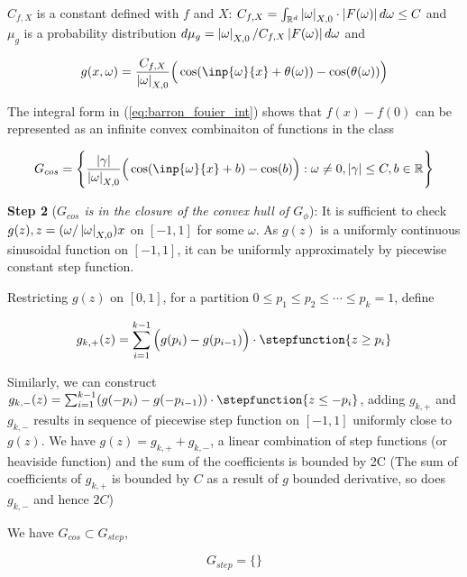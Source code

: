 $C_{f,X}$ is a constant defined with $f$ and 
$X$: $C_{f,X} = \int_{\mathbb{R}^d} \left| \omega \right|_{X, 0} \cdot \left| F(\omega) \right| d\omega \leq C$
and $\mu_g$ is a probability distribution
$d\mu_g = \left| \omega \right|_{X,0}/C_{f,X}\left| F(\omega) \right| d\omega$ and 

\begin{equation}
    g(x, \omega) = \frac{C_{f,X}}{\abs{\omega}_{X, 0}}\Big(\cos(\inp{\omega}{x} + \theta(\omega)) - \cos(\theta(\omega))\Big)
\end{equation}

The integral form in (\ref{eq:barron_fouier_int}) shows that $f(x) - f(0)$
can be represented as an infinite convex combinaiton of functions in the 
class

\begin{equation}
    G_{cos} = \Bigg\{\frac{\abs{\gamma}}{\abs{\omega}_{X, 0}}\Big(\cos(\inp{\omega}{x} + b) - \cos(b)\Big): \omega \not= 0, \abs{\gamma} \leq C, b \in \mathbb{R} \Bigg\}
\end{equation}

\textbf{Step 2} (\textit{$G_{cos}$ is in the closure of the convex hull of $G_{\phi}$}):
It is sufficient to check $g(z), z = (\omega/\left| \omega \right|_{X,0})x$ on $[-1, 1]$ for some $\omega$. 
As $g(z)$ is a uniformly continuous sinusoidal function on $[-1, 1]$, it can be 
uniformly approximately by piecewise constant step function. 

Restricting $g(z)$ on $[0, 1]$, for a partition 
${0 \leq p_1 \leq p_2 \leq \cdots \leq p_k = 1}$, define

\begin{align}
    g_{k,+}(z) = \sum_{i=1}^{k-1} \Big(g(p_i) - g(p_{i-1})\Big) \cdot
    \stepfunction{z\geq p_i}
\end{align}

Similarly, we can construct 
$g_{k,-}(z) = \sum_{i=1}^{k-1} (g(-p_i) - g(-p_{i-1})) \cdot \stepfunction{z\leq -p_i}$,
adding $g_{k,+}$ and $g_{k,-}$ results in sequence of piecewise step function on $[-1, 1]$
uniformly close to $g(z)$. We have $g(z) = g_{k,+}+g_{k,-}$, a linear combination
of step functions (or heaviside function) and the sum of the coefficients is
bounded by 2C (The sum of coefficients of $g_{k,+}$ is bounded by $C$ as a result of $g$
bounded derivative, so does $g_{k,-}$ and hence $2C$)

We have $G_{cos} \subset G_{step}$,

\begin{equation}
    G_{step} = \Bigg\{\Bigg\}
\end{equation}

